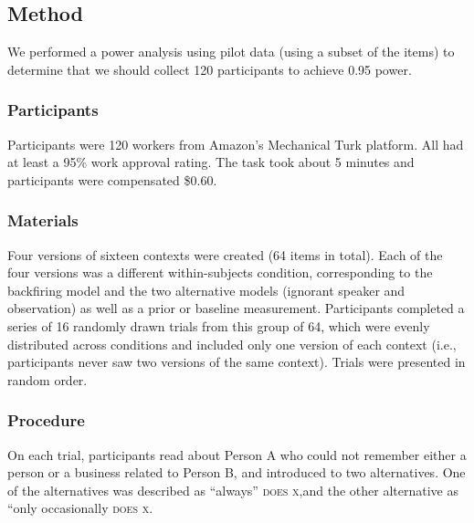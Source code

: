 \documentclass[10pt,letterpaper]{article}
\begin{document}

\subsection{Method}

We performed a power analysis using pilot data (using a subset of the items) to determine that we should collect 120 participants to achieve 0.95 power. 

\subsubsection{Participants}

Participants were 120 workers from Amazon's Mechanical Turk platform. 
All had at least a 95\% work approval rating.
The task took about 5 minutes and participants were compensated \$0.60.

\subsubsection{Materials}

Four versions of sixteen contexts were created (64 items in total). 
Each of the four versions was a different within-subjects condition, corresponding to the backfiring model and the two alternative models (ignorant speaker and observation) as well as a prior or baseline measurement. 
Participants completed a series of 16 randomly drawn trials from this group of 64, which were evenly distributed across conditions and included only one version of each context (i.e., participants never saw two versions of the same context).  
Trials were presented in random order.

\subsubsection{Procedure}

On each trial, participants read about Person A who could not remember either a person or a business related to Person B, and introduced to two alternatives. 
One of the alternatives was described as ``always'' \textsc{does x},and the other alternative as ``only occasionally \textsc{does x}. 
\end{document}
